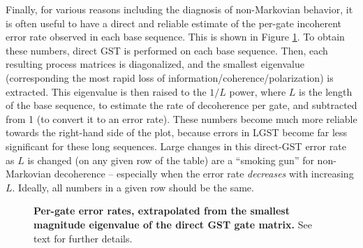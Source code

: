 {Finally, for various reasons including the diagnosis of non-Markovian behavior, it is often useful to have a direct and reliable estimate of the per-gate incoherent error rate observed in each base sequence.  This is shown in Figure \ref{smallEigvalErrRateColorBoxPlot}.  To obtain these numbers, direct GST is performed on each base sequence.  Then, each resulting process matrices is diagonalized, and the smallest eigenvalue (corresponding the most rapid loss of information/coherence/polarization) is extracted.  This eigenvalue is then raised to the $1/L$ power, where $L$ is the length of the base sequence, to estimate the rate of decoherence per gate, and subtracted from 1 (to convert it to an error rate).  These numbers become much more reliable towards the right-hand side of the plot, because errors in LGST become far less significant for these long sequences.  Large changes in this direct-GST error rate as $L$ is changed (on any given row of the table) are a ``smoking gun'' for non-Markovian decoherence -- especially when the error rate \emph{decreases} with increasing $L$.  Ideally, all numbers in a given row should be the same.

\begin{figure}
\begin{center}
\caption{\textbf{Per-gate error rates, extrapolated from the smallest magnitude eigenvalue of the direct GST gate matrix.}  See text for further details.\label{smallEigvalErrRateColorBoxPlot}}
\end{center}
\end{figure}

}{}


